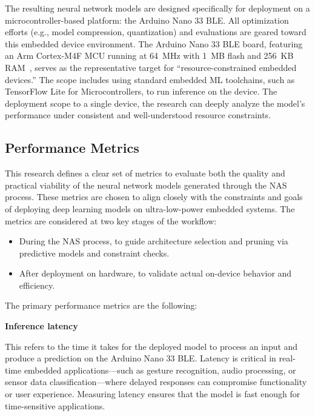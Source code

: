 The resulting neural network models are designed specifically for deployment on a microcontroller-based platform: the Arduino Nano 33 BLE. All optimization efforts (e.g., model compression, quantization) and evaluations are geared toward this embedded device environment. The Arduino Nano 33 BLE board, featuring an Arm Cortex-M4F MCU running at 64~MHz with 1~MB flash and 256~KB RAM~\cite{ArduinoNano}, serves as the representative target for “resource-constrained embedded devices.” The scope includes using standard embedded ML toolchains, such as TensorFlow Lite for Microcontrollers, to run inference on the device. Τhe deployment scope to a single device, the research can deeply analyze the model’s performance under consistent and well-understood resource constraints.

\clearpage

\subsection{Performance Metrics}

This research defines a clear set of metrics to evaluate both the quality and practical viability of the neural network models generated through the NAS process. These metrics are chosen to align closely with the constraints and goals of deploying deep learning models on ultra-low-power embedded systems. The metrics are considered at two key stages of the workflow:
\begin{itemize}
    \item During the NAS process, to guide architecture selection and pruning via predictive models and constraint checks.
\end{itemize}
\begin{itemize}
    \item After deployment on hardware, to validate actual on-device behavior and efficiency.
\end{itemize}
The primary performance metrics are the following:

\textbf{Inference latency}

This refers to the time it takes for the deployed model to process an input and produce a prediction on the Arduino Nano 33 BLE. Latency is critical in real-time embedded applications—such as gesture recognition, audio processing, or sensor data classification—where delayed responses can compromise functionality or user experience. Measuring latency ensures that the model is fast enough for time-sensitive applications.

